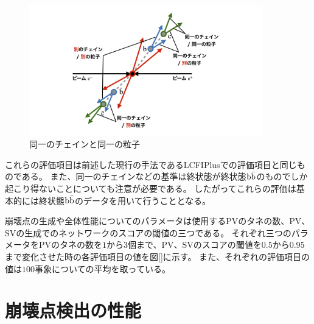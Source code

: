 \begin{figure}[htbp]
 \centering
 \includegraphics[width=0.9\textwidth, clip]{Figure/4VertexFinderwithDL/4-2-0-1SameChainSameParticle.png}
 \caption{同一のチェインと同一の粒子}
 \label{4-2-0-1SameChainSameParticle}
\end{figure}

これらの評価項目は前述した現行の手法であるLCFIPlusでの評価項目と同じものである。
また、同一のチェインなどの基準は終状態が終状態$\rm b\bar{b}$のものでしか起こり得ないことについても注意が必要である。
したがってこれらの評価は基本的には終状態$\rm b\bar{b}$のデータを用いて行うこととなる。

崩壊点の生成や全体性能についてのパラメータは使用するPVのタネの数、PV、SVの生成でのネットワークのスコアの閾値の三つである。
それぞれ三つのパラメータをPVのタネの数を$1$から$3$個まで、PV、SVのスコアの閾値を$0.5$から$0.95$まで変化させた時の各評価項目の値を図\ref{}に示す。
また、それぞれの評価項目の値は$100$事象についての平均を取っている。




\section{崩壊点検出の性能} \label{VFDL:SummaryofVFDL}






















